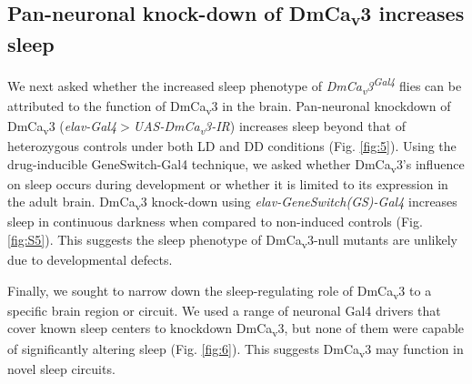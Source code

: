 \subsection*{Pan-neuronal knock-down of DmCa\textsubscript{v}3 increases sleep}

We next asked whether the increased sleep phenotype of \emph{DmCa\textsubscript{v}3\textsuperscript{Gal4}} flies can be attributed to the function of DmCa\textsubscript{v}3 in the brain.
Pan-neuronal knockdown of DmCa\textsubscript{v}3 (\emph{elav-Gal4$>$UAS-DmCa\textsubscript{v}3-IR}) increases sleep beyond that of heterozygous controls under both LD and DD conditions (Fig. \ref{fig:5}).
Using the drug-inducible GeneSwitch-Gal4 technique\cite{Osterwalder:2001cl}, we asked whether DmCa\textsubscript{v}3's influence on sleep occurs during development or whether it is limited to its expression in the adult brain.
DmCa\textsubscript{v}3 knock-down using \emph{elav-GeneSwitch(GS)-Gal4} increases sleep in continuous darkness when compared to non-induced controls (Fig. \ref{fig:S5}).
This suggests the sleep phenotype of DmCa\textsubscript{v}3-null mutants are unlikely due to developmental defects.

Finally, we sought to narrow down the sleep-regulating role of DmCa\textsubscript{v}3 to a specific brain region or circuit.
We used a range of neuronal Gal4 drivers that cover known sleep centers to knockdown DmCa\textsubscript{v}3, but none of them were capable of significantly altering sleep (Fig. \ref{fig:6}).
This suggests DmCa\textsubscript{v}3 may function in novel sleep circuits.
